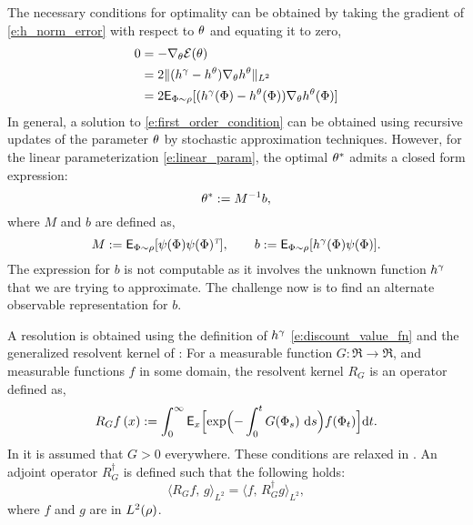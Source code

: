 The necessary conditions for optimality can be obtained by taking the gradient of \eqref{e:h_norm_error} with respect to $\theta$ and equating it to zero, 
\begin{equation}
\begin{aligned}
0 &= - \nabla_\param \error(\param)\\
& = 2 \|(h^\discount - h^\param) \nabla_\param h^\param \|_{L^2} \\
& = 2 \Expect_{\markovstate \sim \pr} [(h^\discount(\markovstate) - h^\param(\markovstate)) \nabla_\param h^\param(\markovstate)]
\end{aligned}
\label{e:first_order_condition}
\end{equation} 
In general, a solution to \eqref{e:first_order_condition} can be obtained using recursive updates of the parameter $\theta$ by stochastic approximation techniques. However, for the linear parameterization \eqref{e:linear_param}, the optimal $\theta^*$ admits a closed form expression:
\begin{equation}
\param^* := M^{-1} b,
\label{e:param_opt_lstd}
\end{equation}
where $M$ and $b$ are defined as,
\begin{equation}
M: = \Expect_{\markovstate \sim \pr} [\basis(\markovstate) \basis(\markovstate)^\transpose], \qquad b:= \Expect_{\markovstate \sim \pr} [h^\discount(\markovstate) \basis(\markovstate)].
\label{e:lstd_M_b}
\end{equation}
The expression for $b$ is not computable as it involves the unknown function $h^\gamma$ that we are trying to approximate. The challenge now is to find an alternate observable representation for $b$. 

A resolution is obtained using the definition of $h^\gamma$ \eqref{e:discount_value_fn} and the generalized resolvent kernel of \cite{nev72,meytwe93e,devkonmey17a}: For a measurable function $G\colon\Re\to\Re$, and measurable functions $f$ in some domain, the resolvent kernel $R_G$ is an operator defined as,
\begin{equation}
R_G f\, (x) := \int_0^\infty \Expect_x\Bigl[ \exp\Bigl(-\int_0^t G(\markovstate_s)\, \rmd s \Bigr) f(\markovstate_t)\Bigr] \ud t.
\label{e:resolvent_neveu}
\end{equation}
In  \cite{nev72,meytwe93e} it is assumed that $G>0$ everywhere. These conditions are relaxed in \cite{konmey03a,devkonmey17a}. An adjoint operator $R^\dagger_G$ is defined such that the following holds:
\begin{equation}
\langle R_G f,\, g \rangle_{L^2} = \langle f ,\, R^\dagger_G g \rangle_{L^2}, 
\label{e:RG_adjoint}
\end{equation}
where $f$ and $g$ are in $L^2(\rho)$. 

